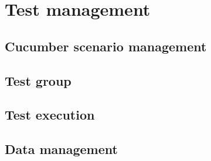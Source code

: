 \section{Test management}\label{sec:test-management}

\subsection{Cucumber scenario management}\label{subsec:cucumber-scenario-management}

\subsection{Test group}\label{subsec:test-group}

\subsection{Test execution}\label{subsec:test-execution}

\subsection{Data management}\label{subsec:data-management}